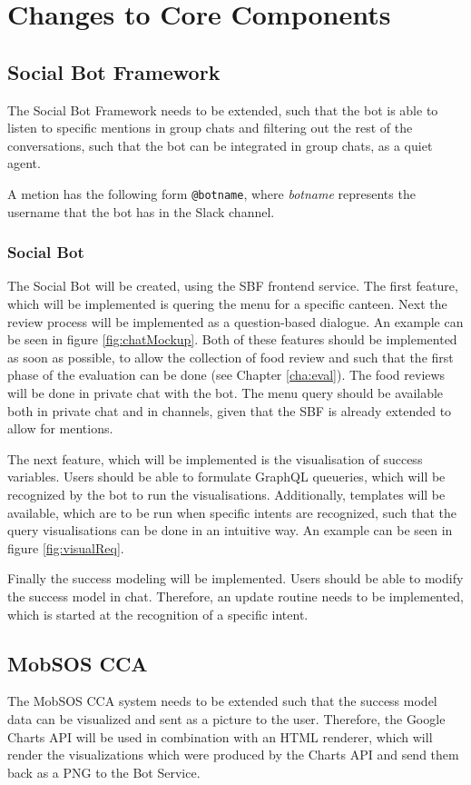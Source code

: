 \newpage

\section{Changes to Core Components} \label{sec:changes}

\subsection{Social Bot Framework}
The Social Bot Framework needs to be extended, such that the bot is able to listen to specific mentions in group chats and filtering out the rest of the conversations, such that the bot can be integrated in group chats, as a quiet agent.

A metion has the following form \texttt{@botname}, where \emph{botname} represents the username that the bot has in the Slack channel.

\subsubsection{Social Bot}
The Social Bot will be created, using the SBF frontend service.
The first feature, which will be implemented is quering the menu for a specific canteen. Next the review process will be implemented as a question-based dialogue. An example can be seen in figure \ref{fig:chatMockup}.
Both of these features should be implemented as soon as possible, to allow the collection of food review and such that the first phase of the evaluation can be done (see Chapter \ref{cha:eval}).
The food reviews will be done in private chat with the bot. The menu query should be available both in private chat and in channels, given that the SBF is already extended to allow for mentions.

The next feature, which will be implemented is the visualisation of success variables. Users should be able to formulate GraphQL queueries, which will be recognized by the bot to run the visualisations. Additionally, templates will be available, which are to be run when specific intents are recognized, such that the query visualisations can be done in an intuitive way. An example can be seen in figure \ref{fig:visualReq}.

Finally the success modeling will be implemented. Users should be able
to modify the success model in chat. Therefore, an update routine needs to be implemented, which is started at the recognition of a specific intent.

\subsection{MobSOS CCA}
The MobSOS CCA system needs to be extended such that the success model data can be visualized and sent as a picture to the user. Therefore, the Google Charts API will be used in combination with an HTML renderer, which will render the visualizations which were produced by the Charts API and send them back as a PNG to the Bot Service.


